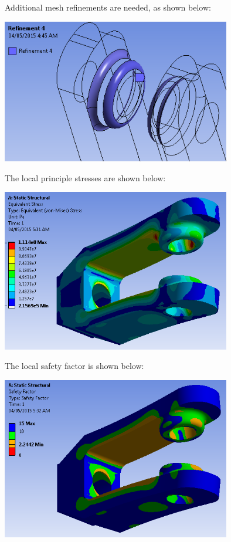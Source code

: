 \documentclass[a4paper,14pt]{extarticle}
\begin{document}
Additional mesh refinements are needed, as shown below:

\begin{center}\includegraphics[width=0.75\textwidth]{NX/REF2.PNG}\end{center}

The local principle stresses are shown below:

\begin{center}\includegraphics[width=0.75\textwidth]{NX/STRESS_F.PNG}\end{center}

The local safety factor is shown below:

\begin{center}\includegraphics[width=0.75\textwidth]{NX/SF_F.PNG}\end{center}
\end{document}
